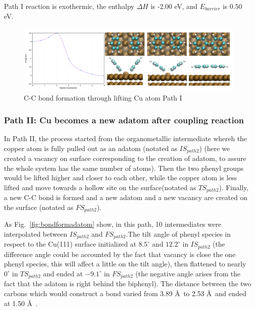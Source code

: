\documentclass[%
 reprint,
 amsmath,amssymb,
 aps,
prb,
]{revtex4-1}
\begin{document}

Path I reaction is exothermic, the enthalpy $\Delta H$ is -2.00 eV, and $E_{barrier}$ is 0.50 eV.

\begin{figure}[hbt]
\centering
\includegraphics[width=1.0\textwidth]{Fig/bondformlift.png}
\caption{C-C bond formation through lifting Cu atom Path I}
\label{fig:bondformlift}
\end{figure}


\subsubsection{Path II: Cu becomes a new adatom after coupling reaction}

In Path II, the process started from the organometallic intermediate whereh the copper atom is fully pulled out as an adatom (notated as $IS_{path2}$) (here we created a vacancy on surface corresponding to the creation of adatom, to assure the whole system has the same number of atoms). Then the two phenyl groups would be lifted higher and closer to each other, while the copper atom is less lifted and move towards a hollow site on the surface(notated as $TS_{path2}$). Finally, a new C-C bond is formed and a new adatom and a new vacancy are created on the surface (notated as $FS_{path2}$).

As Fig.~\ref{fig:bondformadatom} show, in this path, 10 intermediates were interpolated between $IS_{path2}$ and $FS_{path2}$.The tilt angle of phenyl species in respect to the Cu(111) surface initialized at $8.5^\circ$ and $12.2^\circ$ in $IS_{path2}$ (the difference angle could be accounted by the fact that vacancy is close the one phenyl species, this will affect a little on the tilt angle), then flattened to nearly $0^\circ$ in $TS_{path2}$ and ended at $-9.1^\circ$ in $FS_{path2}$ (the negative angle arises from the fact that the adatom is right behind the biphenyl). The distance between the two carbons which would construct a bond varied from 3.89 \AA\ to 2.53 \AA\ and ended at 1.50 \AA\ .
\end{document}
